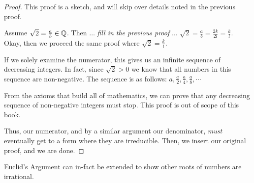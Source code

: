 \documentclass[main.tex]{subfiles}
\begin{document}
\begin{proof}
	This proof is a sketch, and will skip over details noted in the previous proof.
	
	Assume \(\sqrt{2} = \frac{a}{b} \in \mathbb{Q}\). Then \(\dots\) \textit{fill in the previous proof} \(\dots\) \(\sqrt{2} = \frac{a}{b} = \frac{2k}{2l} = \frac{k}{l}\). Okay, then we proceed the same proof where \(\sqrt{2} = \frac{k}{l}\).
	
	If we solely examine the numerator, this gives us an infinite sequence of decreasing integers. In fact, since \(\sqrt{2} > 0\) we know that all numbers in this sequence are non-negative. The sequence is as follows: \(a, \frac{a}{2}, \frac{a}{4}, \frac{a}{8}, \cdots\)
	
	From the axioms that build all of mathematics, we can prove that any decreasing sequence of non-negative integers must stop. This proof is out of scope of this book.
	
	Thus, our numerator, and by a similar argument our denominator, \textit{must} eventually get to a form where they are irreducible. Then, we insert our original proof, and we are done.
\end{proof}

Euclid's Argument can in-fact be extended to show other roots of numbers are irrational.

\end{document}

